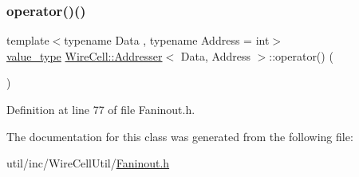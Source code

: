 \subsubsection{\texorpdfstring{operator()()}{operator()()}}
{\footnotesize\ttfamily template$<$typename Data , typename Address  = int$>$ \\
\hyperlink{class_wire_cell_1_1_addresser_a125c54e88bc3ed2233b1730e0a19d82b}{value\+\_\+type} \hyperlink{class_wire_cell_1_1_addresser}{Wire\+Cell\+::\+Addresser}$<$ Data, Address $>$\+::operator() (\begin{DoxyParamCaption}{ }\end{DoxyParamCaption})\hspace{0.3cm}{\ttfamily [inline]}}



Definition at line 77 of file Faninout.\+h.



The documentation for this class was generated from the following file\+:\begin{DoxyCompactItemize}
\item 
util/inc/\+Wire\+Cell\+Util/\hyperlink{_faninout_8h}{Faninout.\+h}\end{DoxyCompactItemize}
